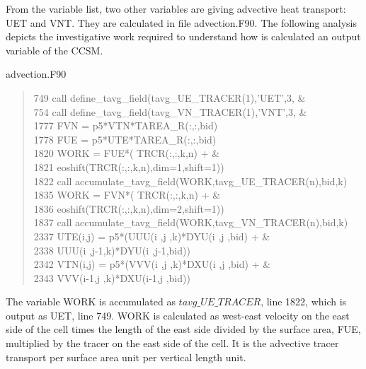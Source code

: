 From the variable list, two other variables are giving advective heat transport: UET and VNT. They are calculated in file advection.F90. The following analysis depicts the investigative work required to understand how is calculated an output variable of the CCSM. 
\begin{center} advection.F90 \end{center}
\begin{quotation}
\small
\linespread{0.5}\selectfont\noindent
\phantom{1}749 \hspace{1em}  call define\_tavg\_field(tavg\_UE\_TRACER(1),'UET',3,     \&\\
\phantom{1}754 \hspace{1em} call define\_tavg\_field(tavg\_VN\_TRACER(1),'VNT',3,                   \&\\
1777 \hspace{1em}         FVN =  p5*VTN*TAREA\_R(:,:,bid)\\
1778  \hspace{1em}        FUE =  p5*UTE*TAREA\_R(:,:,bid)\\
1820  \hspace{1em}             WORK = FUE*(        TRCR(:,:,k,n) + \&\\
1821  \hspace{1em}                         eoshift(TRCR(:,:,k,n),dim=1,shift=1))\\
1822  \hspace{1em}             call accumulate\_tavg\_field(WORK,tavg\_UE\_TRACER(n),bid,k)\\
1835  \hspace{1em}            WORK = FVN*(        TRCR(:,:,k,n) + \&\\
1836  \hspace{1em}                         eoshift(TRCR(:,:,k,n),dim=2,shift=1))\\
1837  \hspace{1em}             call accumulate\_tavg\_field(WORK,tavg\_VN\_TRACER(n),bid,k)\\
2337  \hspace{1em}        UTE(i,j) = p5*(UUU(i  ,j  ,k)*DYU(i  ,j  ,bid) + \&\\
2338  \hspace{1em}                       UUU(i  ,j-1,k)*DYU(i  ,j-1,bid))\\
2342  \hspace{1em}        VTN(i,j) = p5*(VVV(i  ,j  ,k)*DXU(i  ,j  ,bid) + \&\\
2343  \hspace{1em}                       VVV(i-1,j  ,k)*DXU(i-1,j  ,bid))\\
\end{quotation}
The variable WORK is accumulated as $tavg\_UE\_TRACER$, line 1822, which is output as UET, line 749. WORK is calculated as west-east velocity on the east side of the cell times the length of the east side divided by the surface area, FUE, multiplied by the tracer on the east side of the cell. It is the advective tracer transport per surface area unit per vertical length unit.

